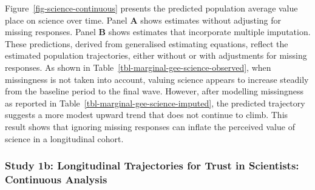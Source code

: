 \documentclass[
  single column]{article}
\begin{document}
\begin{table}

\caption{\label{tbl-marginal-gee-science-imputed}Predicted population
average value placed on science over time, adjusting for missing data.}


\end{table}%

Figure~\ref{fig-science-continuous} presents the predicted population
average value place on science over time. Panel \textbf{A} shows
estimates without adjusting for missing responses. Panel \textbf{B}
shows estimates that incorporate multiple imputation. These predictions,
derived from generalised estimating equations, reflect the estimated
population trajectories, either without or with adjustments for missing
responses. As shown in Table~\ref{tbl-marginal-gee-science-observed},
when missingness is not taken into account, valuing science appears to
increase steadily from the baseline period to the final wave. However,
after modelling missingness as reported in
Table~\ref{tbl-marginal-gee-science-imputed}, the predicted trajectory
suggests a more modest upward trend that does not continue to climb.
This result shows that ignoring missing responses can inflate the
perceived value of science in a longitudinal cohort.

\newpage{}

\subsubsection{Study 1b: Longitudinal Trajectories for Trust in
Scientists: Continuous
Analysis}\label{study-1b-longitudinal-trajectories-for-trust-in-scientists-continuous-analysis}
\end{document}
